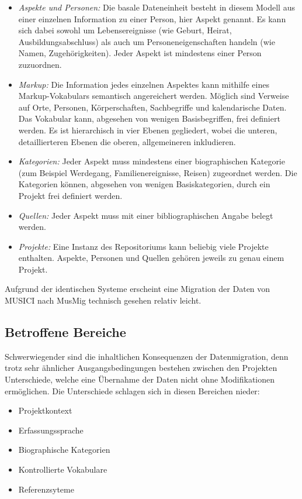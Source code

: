 \documentclass[a4paper,
fontsize=11pt,
oneside,
numbers=noperiodatend,
parskip=half-,
bibliography=totoc,
final
]{scrartcl}
\begin{document}
\begin{itemize}
\item
  \emph{Aspekte und Personen:} Die basale Dateneinheit besteht in diesem
  Modell aus einer einzelnen Information zu einer Person, hier Aspekt
  genannt. Es kann sich dabei sowohl um Lebensereignisse (wie Geburt,
  Heirat, Ausbildungsabschluss) als auch um Personeneigenschaften
  handeln (wie Namen, Zugehörigkeiten). Jeder Aspekt ist mindestens
  einer Person zuzuordnen.
\item
  \emph{Markup:} Die Information jedes einzelnen Aspektes kann mithilfe
  eines Markup-Vokabulars semantisch angereichert werden. Möglich sind
  Verweise auf Orte, Personen, Körperschaften, Sachbegriffe und
  kalendarische Daten. Das Vokabular kann, abgesehen von wenigen
  Basisbegriffen, frei definiert werden. Es ist hierarchisch in vier
  Ebenen gegliedert, wobei die unteren, detaillierteren Ebenen die
  oberen, allgemeineren inkludieren.
\item
  \emph{Kategorien:} Jeder Aspekt muss mindestens einer biographischen
  Kategorie (zum Beispiel Werdegang, Familienereignisse, Reisen)
  zugeordnet werden. Die Kategorien können, abgesehen von wenigen
  Basiskategorien, durch ein Projekt frei definiert werden.
\item
  \emph{Quellen:} Jeder Aspekt muss mit einer bibliographischen Angabe
  belegt werden.
\item
  \emph{Projekte:} Eine Instanz des Repositoriums kann beliebig viele
  Projekte enthalten. Aspekte, Personen und Quellen gehören jeweils zu
  genau einem Projekt.
\end{itemize}

Aufgrund der identischen Systeme erscheint eine Migration der Daten von
MUSICI nach MusMig technisch gesehen relativ leicht.

\subsection*{Betroffene Bereiche}\label{betroffene-bereiche}

Schwerwiegender sind die inhaltlichen Konsequenzen der Datenmigration,
denn trotz sehr ähnlicher Ausgangsbedingungen bestehen zwischen den
Projekten Unterschiede, welche eine Übernahme der Daten nicht ohne
Modifikationen ermöglichen. Die Unterschiede schlagen sich in diesen
Bereichen nieder:

\begin{itemize}
\item
  Projektkontext
\item
  Erfassungssprache
\item
  Biographische Kategorien
\item
  Kontrollierte Vokabulare
\item
  Referenzsyteme
\end{itemize}
\end{document}
